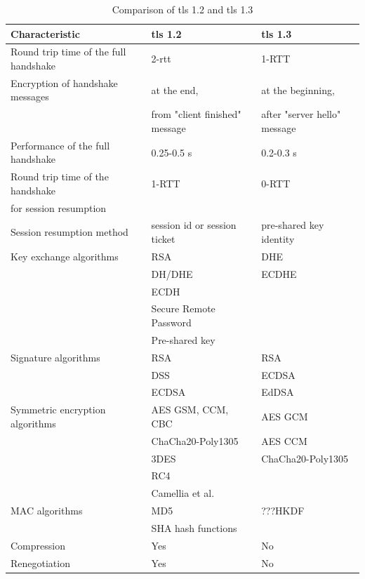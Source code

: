\begin{table}[H]
	\centering
		\begin{tabular}{lll} \toprule
			\textbf{Characteristic} & \textbf{\gls{tls} 1.2} & \textbf{\gls{tls} 1.3} \\ \midrule
			Round trip time of the full handshake & 2-\gls{rtt} & 1-RTT \\ \midrule
			Encryption of handshake messages & at the end, & at the beginning, \\ 
			& from "client finished" message & after "server hello" message \\ \midrule
			Performance of the full handshake & 0.25-0.5 s & 0.2-0.3 s\\ \midrule
			Round trip time of the handshake & 1-RTT & 0-RTT \\ 
			for session resumption \\ \midrule
			Session resumption method & session id or session ticket & pre-shared key identity \\ \midrule
			Key exchange algorithms & RSA & DHE\\ 
			& DH/DHE & ECDHE\\
			& ECDH \\
			& Secure Remote Password \\
			& Pre-shared key \\ \midrule
			Signature algorithms & RSA & RSA\\
			& DSS & ECDSA\\
			& ECDSA & EdDSA \\ \midrule
			Symmetric encryption algorithms & AES GSM, CCM, CBC  & AES GCM\\
			& ChaCha20-Poly1305 & AES CCM \\
			& 3DES & ChaCha20-Poly1305 \\
			& RC4 \\
			& Camellia et al.\\ \midrule
			MAC algorithms & MD5 & ???HKDF\\
			& SHA hash functions \\ \midrule
			Compression & Yes & No \\ \midrule
			Renegotiation & Yes & No \\ \midrule
			

		\end{tabular}
	\caption{Comparison of \gls{tls} 1.2 and \gls{tls} 1.3}
	\label{tab:comparison}
\end{table}

